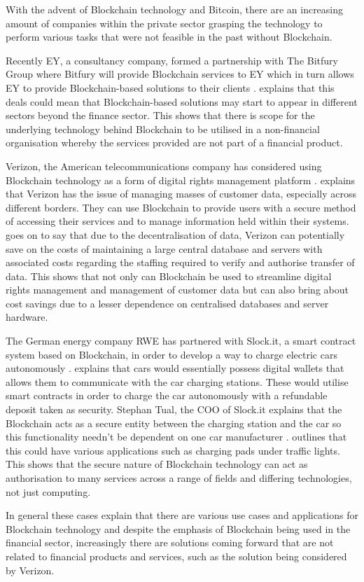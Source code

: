 \documentclass{article}
\begin{document}
With the advent of Blockchain technology and Bitcoin, there are an increasing amount of companies within the private sector grasping the technology to perform various tasks that were not feasible in the past without Blockchain.
\par
Recently EY, a consultancy company, formed a partnership with The Bitfury Group where Bitfury will provide Blockchain services to EY which in turn allows EY to provide Blockchain-based solutions to their clients \parencite{eyblockchain}. \textcite{eyblockchain} explains that this deals could mean that Blockchain-based solutions may start to appear in different sectors beyond the finance sector. This shows that there is scope for the underlying technology behind Blockchain to be utilised in a non-financial organisation whereby the services provided are not part of a financial product.
\par
Verizon, the American telecommunications company has considered using Blockchain technology as a form of digital rights management platform \parencite{verizonblockchain}. \textcite{verizonblockchain} explains that Verizon has the issue of managing masses of customer data, especially across different borders. They can use Blockchain to provide users with a secure method of accessing their services and to manage information held within their systems. \textcite{verizonblockchain} goes on to say that due to the decentralisation of data, Verizon can potentially save on the costs of maintaining a large central database and servers with associated costs regarding the staffing required to verify and authorise transfer of data. This shows that not only can Blockchain be used to streamline digital rights management and management of customer data but can also bring about cost savings due to a lesser dependence on centralised databases and server hardware.
\par
The German energy company RWE has partnered with Slock.it, a smart contract system based on Blockchain, in order to develop a way to charge electric cars autonomously \parencite{rweblockchain}. \textcite{rweblockchain} explains that cars would essentially possess digital wallets that allows them to communicate with the car charging stations. These would utilise smart contracts in order to charge the car autonomously with a refundable deposit taken as security. Stephan Tual, the COO of Slock.it explains that the Blockchain acts as a secure entity between the charging station and the car so this functionality needn't be dependent on one car manufacturer \parencite{rweblockchain}. \textcite{rweblockchain} outlines that this could have various applications such as charging pads under traffic lights. This shows that the secure nature of Blockchain technology can act as authorisation to many services across a range of fields and differing technologies, not just computing.
\par
In general these cases explain that there are various use cases and applications for Blockchain technology and despite the emphasis of Blockchain being used in the financial sector, increasingly there are solutions coming forward that are not related to financial products and services, such as the solution being considered by Verizon.
\end{document}
